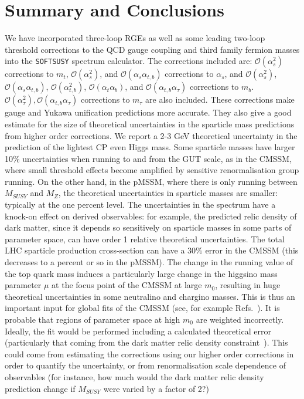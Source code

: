 \documentclass[final,3p,times,pdflatex]{elsarticle}
\begin{document}
\section{Summary and Conclusions}
 We have incorporated three-loop RGEs as well as some leading two-loop
 threshold corrections to the QCD gauge coupling and third family fermion
 masses into the {\tt SOFTSUSY} spectrum calculator. The corrections included
 are: $\mathcal O(\alpha_s^2)$ corrections to $m_t$, $\mathcal O(\alpha_s^2)$,
 and $\mathcal O(\alpha_s \alpha_{t,b})$ 
 corrections to $\alpha_s$, and $\mathcal O(\alpha_s^2)$, 
 $\mathcal O(\alpha_s \alpha_{t,b})$, $\mathcal O(\alpha_{t,b}^2)$, $\mathcal O(\alpha_t \alpha_b)$, and $\mathcal O(\alpha_{t,b} \alpha_\tau)$ corrections to
 $m_b$. $\mathcal O(\alpha_\tau^2), \mathcal O(\alpha_{t,b} \alpha_\tau)$ 
 corrections to $m_\tau$ are also included. These corrections make gauge and
 Yukawa unification  predictions more accurate. They also give a good estimate
 for the size of theoretical uncertainties in the sparticle mass predictions
 from higher order corrections. We report a 2-3 GeV theoretical uncertainty in
 the prediction  of 
 the lightest CP even Higgs mass. Some sparticle masses have larger 10$\%$
 uncertainties when running to and from the GUT scale, as in the CMSSM, where
 small threshold effects become amplified by sensitive renormalisation group
 running. On the other hand, in the pMSSM, where there is only running between
 $M_{SUSY}$ and $M_Z$, the theoretical uncertainties in sparticle masses are
 smaller: typically at the one percent level. The uncertainties in the spectrum
 have a knock-on effect on derived observables: for example, the predicted
 relic density of dark matter, since it depends so sensitively on sparticle
 masses in some parts of parameter space, can have order 1 relative theoretical
 uncertainties. The total LHC sparticle production cross-section can have a
 $30\%$ error in the CMSSM (this decreases to a percent or so in the pMSSM).
 The change in the running
 value of the top quark mass induces a particularly large change in the
 higgsino mass parameter $\mu$ at the focus point of the CMSSM at large $m_0$,
 resulting in 
 huge theoretical uncertainties in some neutralino and chargino masses. 
 This is thus an important input for global fits of the CMSSM (see, for example
Refs.~\cite{Buchmueller:2011ab,Allanach:2011wi,Roszkowski:2014wqa,Fowlie:2013oua}). It 
is probable that regions of parameter space at high 
$m_0$ are weighted 
incorrectly. Ideally, the fit would be performed including a calculated
 theoretical error (particularly that coming from the dark matter relic
 density constraint~\cite{Belanger:2005jk}). This could come from estimating
 the corrections using  
 our higher order corrections in order to quantify the uncertainty, or from
 renormalisation scale dependence of observables (for instance, how much would
 the dark matter relic density prediction change if $M_{SUSY}$ were varied by
 a factor of 2?)
\end{document}
